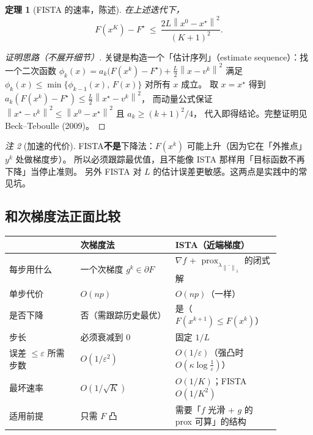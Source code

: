 \documentclass[11pt,a4paper,UTF8]{ctexart}
\theoremstyle{plain}
\newtheorem{theorem}{定理}[section]
\theoremstyle{definition}
\theoremstyle{remark}
\newtheorem{remark}[theorem]{注}
\newcommand{\norm}[1]{\left\lVert #1 \right\rVert}
\newcommand{\prox}{\operatorname{prox}}
\newcommand{\eps}{\varepsilon}
\begin{document}
\begin{theorem}[FISTA 的速率，陈述]
在上述迭代下，
\[
F(x^K)-F^\star\ \le\ \frac{2L\norm{x^0-x^\star}^2}{(K+1)^2}.
\]
\end{theorem}

\begin{proof}[证明思路（不展开细节）]
关键是构造一个「估计序列」（estimate sequence）：找一个二次函数
$\phi_k(x)=a_k\bigl(F(x^k)-F^\star\bigr)+\frac L2\norm{x-v^k}^2$ 满足
$\phi_k(x)\le\min\{\phi_{k-1}(x),\,F(x)\}$ 对所有 $x$ 成立。
取 $x=x^\star$ 得到 $a_k(F(x^k)-F^\star)\le\frac L2\norm{x^\star-v^k}^2$，
而动量公式保证 $\norm{x^\star-v^k}^2\le\norm{x^0-x^\star}^2$ 且 $a_k\ge (k+1)^2/4$，
代入即得结论。完整证明见 Beck--Teboulle (2009)。
\end{proof}

\begin{remark}[加速的代价]
FISTA\textbf{不是}下降法：$F(x^k)$ 可能上升（因为它在「外推点」$y^k$ 处做梯度步）。
所以必须跟踪最优值，且不能像 ISTA 那样用「目标函数不再下降」当停止准则。
另外 FISTA 对 $L$ 的估计误差更敏感。这两点是实践中的常见坑。
\end{remark}

\subsection{和次梯度法正面比较}

\begin{center}
\small
\begin{tabular}{@{}p{0.24\linewidth}p{0.32\linewidth}p{0.32\linewidth}@{}}
\toprule
 & 次梯度法 & ISTA（近端梯度）\\
\midrule
每步用什么 & 一个次梯度 $g^k\in\partial F$ & $\nabla f$ + $\prox_{\lambda\norm\cdot_1}$ 的闭式解\\
单步代价 & $O(np)$ & $O(np)$（一样）\\
是否下降 & 否（需跟踪历史最优） & 是（$F(x^{k+1})\le F(x^k)$）\\
步长 & 必须衰减到 $0$ & 固定 $1/L$\\
误差 $\le\eps$ 所需步数 & $O(1/\eps^2)$ & $O(1/\eps)$（强凸时 $O(\kappa\log\frac1\eps)$）\\
最坏速率 & $O(1/\sqrt K)$ & $O(1/K)$；FISTA $O(1/K^2)$\\
适用前提 & 只需 $F$ 凸 & 需要「$f$ 光滑 + $g$ 的 prox 可算」的结构\\
\bottomrule
\end{tabular}
\end{center}
\end{document}
